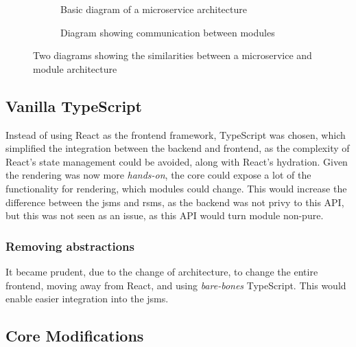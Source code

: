 \begin{figure}[H]
  \begin{subfigure}[h]{0.49\linewidth}
    
    \caption{Basic diagram of a microservice architecture}
    \label{sfig:mic}
  \end{subfigure}
  \hfill
  \begin{subfigure}[h]{0.49\linewidth}
    
    \caption{Diagram showing communication between modules}
    \label{sfig:mod}
  \end{subfigure}
  \caption{
    Two diagrams showing the similarities between a microservice and module
    architecture
  }
  \label{fig:comp}
\end{figure}

\subsection{Vanilla TypeScript}

Instead of using React as the frontend framework, TypeScript was chosen, which
simplified the integration between the backend and frontend, as the complexity
of React's state management could be avoided, along with React's hydration.
Given the rendering was now more \textit{hands-on}, the core could expose a lot
of the functionality for rendering, which modules could change. This would
increase the difference between the \gls*{jsms} and \gls*{rsms}, as the backend
was not privy to this API, but this was not seen as an issue, as this API would
turn module non-pure.

\subsubsection{Removing abstractions}

It became prudent, due to the change of architecture, to change the entire
frontend, moving away from React, and using \textit{bare-bones} TypeScript. This
would enable easier integration into the \gls*{jsms}.

\subsection{Core Modifications}

